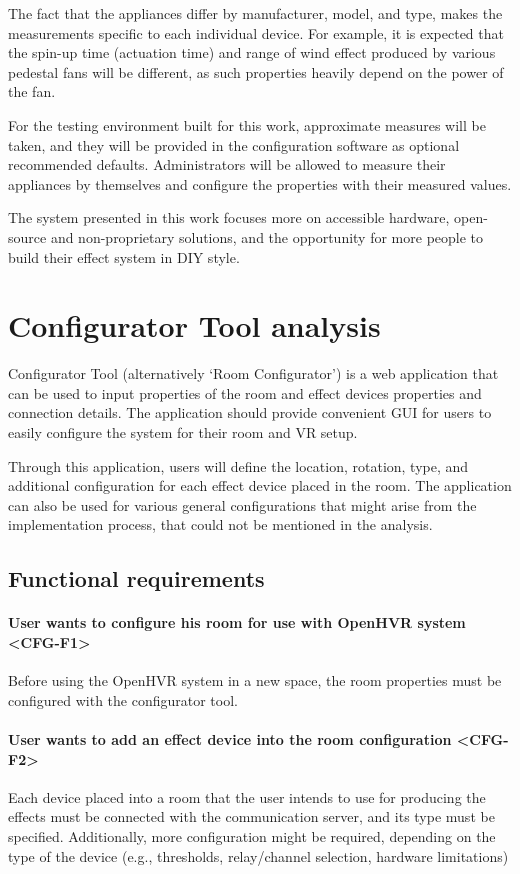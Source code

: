 The fact that the appliances differ by manufacturer, model, and type,
makes the measurements specific to each individual device.
For example, it is expected that the spin-up time
(actuation time) and range of wind effect produced by various pedestal fans
will be different, as such properties heavily depend on the power of the fan.

\pagebreak

For the testing environment built for this work, approximate measures will be
taken, and they will be provided in the configuration software as optional
recommended defaults. Administrators will be allowed
to measure their appliances by themselves and configure the properties with
their measured values.


The system presented in this work focuses more
on accessible hardware, open-source and non-proprietary solutions, and
the opportunity for more people to build their effect system in DIY style.


\section{Configurator Tool analysis}\label{analysis:conftool}
Configurator Tool (alternatively `Room Configurator') is a web application that
can be used to input properties of the room and effect devices properties and
connection details.
The application should provide convenient GUI
for users to easily configure the system for their room and VR setup.


Through this application, users will define the location, rotation, type, and
additional configuration for each effect device placed in the room. The application
can also be used for various general configurations that might arise from
the implementation process, that could not be mentioned in the analysis.


\subsection{Functional requirements}
\paragraph*{User wants to configure his room for use with OpenHVR system <CFG-F1>}
\label{cfg-f1}
Before using the OpenHVR system in a new space,
the room properties must be configured with the configurator tool.


\paragraph*{User wants to add an effect device into the room configuration <CFG-F2>}
\label{cfg-f2}
Each device placed into a room that the user intends to use for producing the effects
must be connected with the communication server, and its type must be specified.
Additionally, more configuration might be required, depending on the type
of the device (e.g., thresholds, relay/channel selection, hardware limitations)


